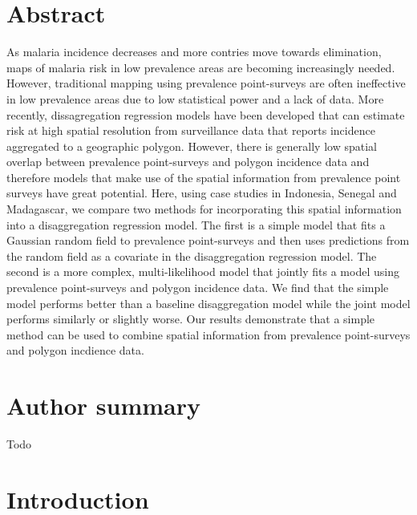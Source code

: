 \documentclass[10pt,letterpaper]{article}
\begin{document}
\section*{Abstract}
As malaria incidence decreases and more contries move towards elimination, maps of malaria risk in low prevalence areas are becoming increasingly needed.
However, traditional mapping using prevalence point-surveys are often ineffective in low prevalence areas due to low statistical power and a lack of data.
More recently, dissagregation regression models have been developed that can estimate risk at high spatial resolution from surveillance data that reports incidence aggregated to a geographic polygon.
However, there is generally low spatial overlap between prevalence point-surveys and polygon incidence data and therefore models that make use of the spatial information from prevalence point surveys have great potential.
Here, using case studies in Indonesia, Senegal and Madagascar, we compare two methods for incorporating this spatial information into a disaggregation regression model.
The first is a simple model that fits a Gaussian random field to prevalence point-surveys and then uses predictions from the random field as a covariate in the disaggregation regression model.
The second is a more complex, multi-likelihood model that jointly fits a model using prevalence point-surveys and  polygon incidence data.
We find that the simple model performs better than a baseline disaggregation model while the joint model performs similarly or slightly worse.
Our results demonstrate that a simple method can be used to combine spatial information from prevalence point-surveys and polygon incdience data.



\section*{Author summary}
Todo


\linenumbers

\section*{Introduction}
\end{document}
